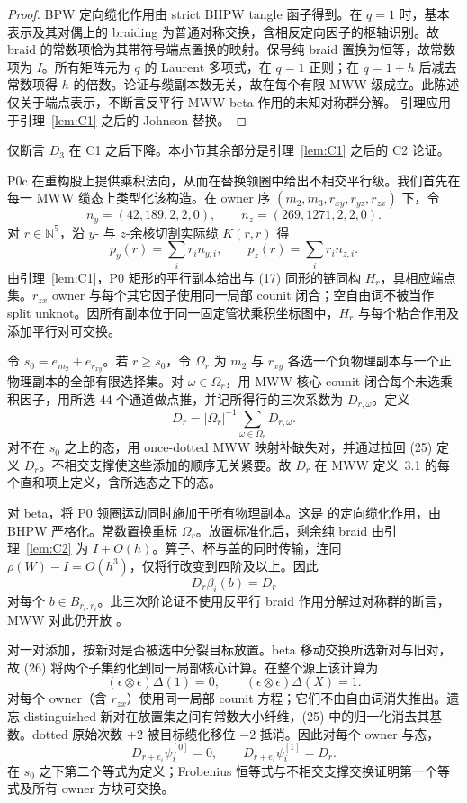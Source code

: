 \begin{proof}
BPW 定向缆化作用由 strict BHPW tangle 函子得到。在 \(q=1\) 时，基本表示及其对偶上的 braiding 为普通对称交换，含相反定向因子的枢轴识别。故 braid 的常数项恰为其带符号端点置换的映射。保号纯 braid 置换为恒等，故常数项为 \(I\)。所有矩阵元为 \(q\) 的 Laurent 多项式，在 \(q=1\) 正则；在 \(q=1+h\) 后减去常数项得 \(h\) 的倍数。论证与缆副本数无关，故在每个有限 MWW 级成立。此陈述仅关于端点表示，不断言反平行 MWW beta 作用的未知对称群分解。
引理应用于引理~\ref{lem:C1} 之后的 Johnson 替换。
\end{proof}

仅断言 $D_3$ 在 C1 之后下降。本小节其余部分是引理~\ref{lem:C1} 之后的 C2 论证。

P0c 在重构股上提供乘积法向，从而在替换领圈中给出不相交平行级。我们首先在每一 MWW 缆态上类型化该构造。在 owner 序 $(m_2,m_3,r_{xy},r_{yz},r_{zx})$ 下，令
\[
n_y=(42,189,2,2,0),\qquad n_z=(269,1271,2,2,0).
\]
对 $r\in\mathbb N^5$，沿 $y$- 与 $z$-余核切割实际缆 $K(r,r)$ 得
\[
p_y(r)=\sum_i r_i n_{y,i},\qquad
p_z(r)=\sum_i r_i n_{z,i}.
\tag{24}
\]
由引理~\ref{lem:C1}，P0 矩形的平行副本给出与 (17) 同形的链同构 $H_r$，具相应端点集。$r_{zx}$ owner 与每个其它因子使用同一局部 counit 闭合；空自由词不被当作 split unknot。因所有副本位于同一固定管状乘积坐标图中，$H_r$ 与每个粘合作用及添加平行对可交换。

令 $s_0=e_{m_2}+e_{r_{xy}}$。若 $r\ge s_0$，令 $\Omega_r$ 为 $m_2$ 与 $r_{xy}$ 各选一个负物理副本与一个正物理副本的全部有限选择集。对 $\omega\in\Omega_r$，用 MWW 核心 counit 闭合每个未选乘积因子，用所选 44 个通道做点推，并记所得行的三次系数为 $D_{r,\omega}$。定义
\[
D_r=|\Omega_r|^{-1}\sum_{\omega\in\Omega_r}D_{r,\omega}.
\tag{25}
\]
对不在 $s_0$ 之上的态，用 once-dotted MWW 映射补缺失对，并通过拉回 (25) 定义 $D_r$。不相交支撑使这些添加的顺序无关紧要。故 $D_r$ 在 MWW 定义~3.1 的每个直和项上定义，含所选态之下的态。

对 beta，将 P0 领圈运动同时施加于所有物理副本。这是 \cite[Theorem~E]{BeliakovaPutyraWehrli2019} 的定向缆化作用，由 BHPW 严格化。常数置换重标 $\Omega_r$。放置标准化后，剩余纯 braid 由引理~\ref{lem:C2} 为 \(I+O(h)\)。算子、杯与盖的同时传输，连同 $\rho(W)-I=O(h^3)$，仅将行改变到四阶及以上。因此
\[
D_r\beta_i(b)=D_r
\tag{26}
\]
对每个 $b\in B_{r_i,r_i}$。此三次阶论证不使用反平行 braid 作用分解过对称群的断言，MWW 对此仍开放
\cite[Remark~3.3]{ManolescuWalkerWedrich2023}。

对一对添加，按新对是否被选中分裂目标放置。beta 移动交换所选新对与旧对，故 (26) 将两个子集约化到同一局部核心计算。在整个源上该计算为
\[
(\epsilon\otimes\epsilon)\Delta(1)=0,\qquad
(\epsilon\otimes\epsilon)\Delta(X)=1.
\]
对每个 owner（含 $r_{zx}$）使用同一局部 counit 方程；它们不由自由词消失推出。遗忘 distinguished 新对在放置集之间有常数大小纤维，(25) 中的归一化消去其基数。dotted 原始次数 $+2$ 被目标缆化移位 $-2$ 抵消。因此对每个 owner 与态，
\[
D_{r+e_i}\psi_i^{[0]}=0,\qquad
D_{r+e_i}\psi_i^{[1]}=D_r.
\tag{27}
\]
在 $s_0$ 之下第二个等式为定义；Frobenius 恒等式与不相交支撑交换证明第一个等式及所有 owner 方块可交换。

